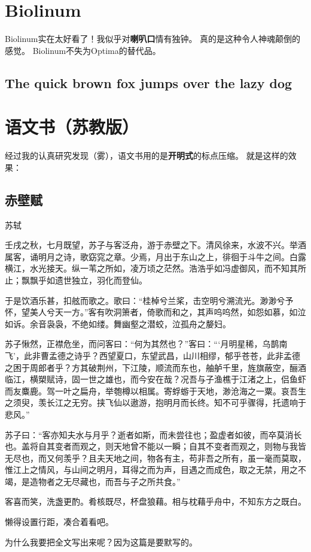 \documentclass[a5paper, 10pt]{article}
\begin{document}
    \section{Biolinum}{
        Biolinum实在太好看了！我似乎对\textbf{喇叭口}情有独钟。
        真的是这种令人神魂颠倒的感觉。
        Biolinum不失为Optima的替代品。

        \subsection*{The quick brown fox jumps over the lazy dog}{
            \blindtext
        }
    }
    \pagebreak
    \section{语文书（苏教版）}{
        经过我的认真研究发现（雾），语文书用的是\textbf{开明式}的标点压缩。
        就是这样的效果：

        \subsection*{赤壁赋}{
            \kaishu
            苏轼

            \songti
            壬戌之秋，七月既望，苏子与客泛舟，游于赤壁之下。清风徐来，水波不兴。举酒属客，诵明月之诗，歌窈窕之章。少焉，月出于东山之上，徘徊于斗牛之间。白露横江，水光接天。纵一苇之所如，凌万顷之茫然。浩浩乎如冯虚御风，而不知其所止；飘飘乎如遗世独立，羽化而登仙。

            于是饮酒乐甚，扣舷而歌之。歌曰：“桂棹兮兰桨，击空明兮溯流光。渺渺兮予怀，望美人兮天一方。”客有吹洞箫者，倚歌而和之，其声呜呜然，如怨如慕，如泣如诉。余音袅袅，不绝如缕。舞幽壑之潜蛟，泣孤舟之嫠妇。

            苏子愀然，正襟危坐，而问客曰：“何为其然也？”客曰：“‘月明星稀，乌鹊南飞’，此非曹孟德之诗乎？西望夏口，东望武昌，山川相缪，郁乎苍苍，此非孟德之困于周郎者乎？方其破荆州，下江陵，顺流而东也，舳舻千里，旌旗蔽空，酾酒临江，横槊赋诗，固一世之雄也，而今安在哉？况吾与子渔樵于江渚之上，侣鱼虾而友麋鹿。驾一叶之扁舟，举匏樽以相属。寄蜉蝣于天地，渺沧海之一粟。哀吾生之须臾，羡长江之无穷。挟飞仙以遨游，抱明月而长终。知不可乎骤得，托遗响于悲风。”

            苏子曰：“客亦知夫水与月乎？逝者如斯，而未尝往也；盈虚者如彼，而卒莫消长也。盖将自其变者而观之，则天地曾不能以一瞬；自其不变者而观之，则物与我皆无尽也，而又何羡乎？且夫天地之间，物各有主，苟非吾之所有，虽一毫而莫取，惟江上之情风，与山间之明月，耳得之而为声，目遇之而成色，取之无禁，用之不竭，是造物者之无尽藏也，而吾与子之所共食。”

            客喜而笑，洗盏更酌。肴核既尽，杯盘狼藉。相与枕藉乎舟中，不知东方之既白。
        }

        \vspace{5mm}
        懒得设置行距，凑合着看吧。

        为什么我要把全文写出来呢？因为这篇是要默写的。
    }
    \pagebreak
\end{document}
